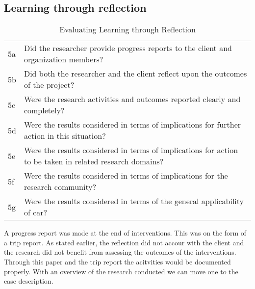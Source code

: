 \subsection{Learning through reflection}
\begin{table}
\centering
\begin{tabular}{p{2cm} p{8cm}}
\hline
5a & Did the researcher provide progress reports to the client and organization members? \\
5b & Did both the researcher and the client reflect upon the outcomes of the project? \\
5c & Were the research activities and outcomes reported clearly and completely? \\
5d & Were the results considered in terms of implications for further action in this situation?  \\
5e & Were the results considered in terms of implications for action to be taken in related research domains? \\
5f & Were the results considered in terms of implications for the research community? \\
5g & Were the results considered in terms of the general applicability of \gls{car}?  \\
\hline
\end{tabular}
\caption{Evaluating Learning through Reflection}
\label{tab:eva}
\end{table}
A progress report was made at the end of interventions. This was on the form of a trip report.
As stated earlier, the reflection did not accour with the client and the research did not benefit from assessing the outcomes of the interventions. Through this paper and the trip report the acitvities would be documented properly.
With an overview of the research conducted we can move one to the case description. 
\cite{car:rmn}
